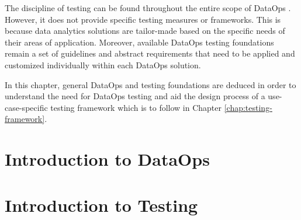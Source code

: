 
The discipline of testing can be found throughout the entire scope of DataOps \cite[42]{Schmidt2019}. However, it does not provide specific testing measures or frameworks. This is because data analytics solutions are tailor-made based on the specific needs of their areas of application. Moreover, available DataOps testing foundations remain a set of guidelines and abstract requirements that need to be applied and customized individually within each DataOps solution.

In this chapter, general DataOps and testing foundations are deduced in order to understand the need for DataOps testing and aid the design process of a use-case-specific testing framework which is to follow in Chapter \ref{chap:testing-framework}.


\section{Introduction to DataOps}
	\label{sec:2-dataops}
    
    

\section{Introduction to Testing}
	\label{sec:2-testing}
    


